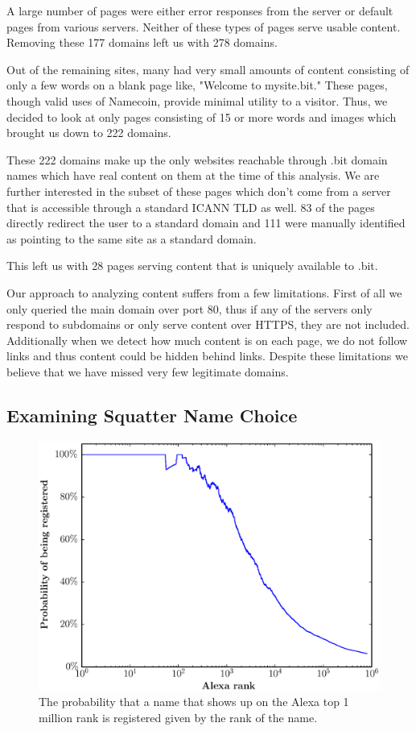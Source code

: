 A large number of pages were either error responses from the server or default pages from various servers. Neither of these types of pages serve usable content. Removing these 177 domains left us with 278 domains.

Out of the remaining sites, many had very small amounts of content consisting of only a few words on a blank page like, "Welcome to mysite.bit." These pages, though valid uses of Namecoin, provide minimal utility to a visitor. Thus, we decided to look at only pages consisting of 15 or more words and images which brought us down to 222 domains.

These 222 domains make up the only websites reachable through .bit domain names which have real content on them at the time of this analysis. We are further interested in the subset of these pages which don't come from a server that is accessible through a standard ICANN TLD as well.  83 of the pages directly redirect the user to a standard domain and 111 were manually identified as pointing to the same site as a standard domain.

This left us with 28 pages serving content that is uniquely available to .bit.

Our approach to analyzing content suffers from a few limitations. First of all we only queried the main domain over port 80, thus if any of the servers only respond to subdomains or only serve content over HTTPS, they are not included. Additionally when we detect how much content is on each page, we do not follow links and thus content could be hidden behind links. Despite these limitations we believe that we have missed very few legitimate domains.

\subsection{Examining Squatter Name Choice}

\begin{figure}[t]
  \centering
  \includegraphics[width=\columnwidth]{figures/alexa_probability}
  \caption{The probability that a name that shows up on the Alexa top 1 million rank is registered given by the rank of the name.}
  \label{fig:alexa_probability}
\end{figure}

